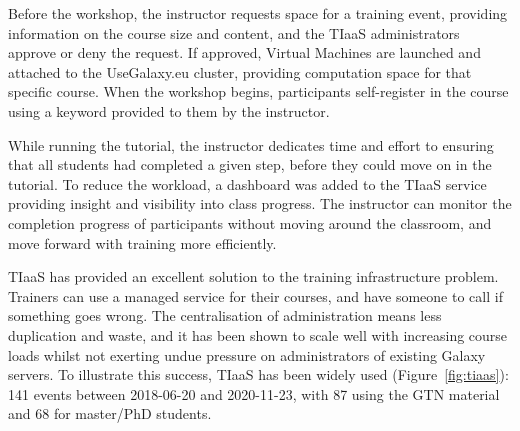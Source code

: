 \documentclass[10pt,letterpaper]{article}
\begin{document}
Before the workshop, the instructor requests space for a training event, providing information on the course size and content, and the TIaaS administrators approve or deny the request.
If approved, Virtual Machines are launched and attached to the UseGalaxy.eu cluster, providing computation space for that specific course.
When the workshop begins, participants self-register in the course using a keyword provided to them by the instructor.

While running the tutorial, the instructor dedicates time and effort to ensuring that all students had completed a given step, before they could move on in the tutorial. To reduce the workload, a dashboard was added to the TIaaS service providing insight and visibility into class progress. The instructor can monitor the completion progress of participants without moving around the classroom, and move forward with training more efficiently.

TIaaS has provided an excellent solution to the training infrastructure problem. Trainers can use a managed service for their courses, and have someone to call if something goes wrong. The centralisation of administration means less duplication and waste, and it has been shown to scale well with increasing course loads whilst not exerting undue pressure on administrators of existing Galaxy servers. To illustrate this success, TIaaS has been widely used (Figure~\ref{fig:tiaas}): 141 events between 2018-06-20 and 2020-11-23, with 87 using the GTN material and 68 for master/PhD students. 
\end{document}
